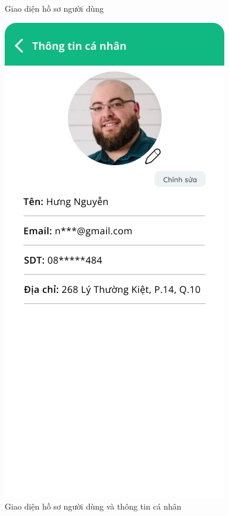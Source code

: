 \begin{figure}[!htb]
\begin{minipage}{0.32\textwidth}
     \caption{Giao diện hồ sơ người dùng}
    \end{minipage}\hspace{1cm}
    \begin{minipage}{0.32\textwidth}
     \centering
     \includegraphics[width=1\linewidth]{Images/UI figma/Profile - Detail.png}
     \caption{Giao diện hồ sơ người dùng và thông tin cá nhân}
    \end{minipage}
\end{figure}
\newpage
